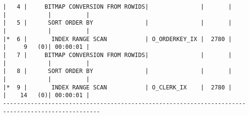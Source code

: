 \documentclass[11pt,a4paper,parskip=half]{scrartcl}
\begin{document}
\begin{lstlisting}
|   4 |     BITMAP CONVERSION FROM ROWIDS|               |       |       |            |          |                                                                                                                                                                                                           
|   5 |      SORT ORDER BY               |               |       |       |            |          |                                                                                                                                                                                                           
|*  6 |       INDEX RANGE SCAN           | O_ORDERKEY_IX |  2780 |       |     9   (0)| 00:00:01 |                                                                                                                                                                                                           
|   7 |     BITMAP CONVERSION FROM ROWIDS|               |       |       |            |          |                                                                                                                                                                                                           
|   8 |      SORT ORDER BY               |               |       |       |            |          |                                                                                                                                                                                                           
|*  9 |       INDEX RANGE SCAN           | O_CLERK_IX    |  2780 |       |    14   (0)| 00:00:01 |                                                                                                                                                                                                           
--------------------------------------------------------------------------------------------------                                                                                                                                                                                                           
                                                                                                                                                                                                                                                                                                             

\end{lstlisting}
\end{document}
